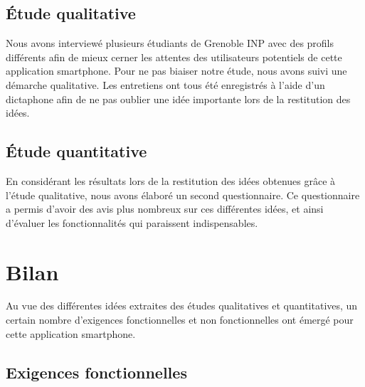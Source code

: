\documentclass[a4paper, 11px]{article}
\begin{document}
\subsection{Étude qualitative}
Nous avons interviewé plusieurs étudiants de Grenoble INP avec des profils différents afin de mieux cerner les attentes des utilisateurs potentiels de cette application smartphone. Pour ne pas biaiser notre étude, nous avons suivi une démarche qualitative.
Les entretiens ont tous été enregistrés à l'aide d'un dictaphone afin de ne pas oublier une idée importante lors de la restitution des idées. 

\subsection{Étude quantitative}
En considérant les résultats lors de la restitution des idées obtenues grâce à l'étude qualitative, nous avons élaboré un second questionnaire. Ce questionnaire a permis d'avoir des avis plus nombreux sur ces différentes idées, et ainsi d'évaluer les fonctionnalités qui paraissent indispensables.

\newpage

\section{Bilan}
Au vue des différentes idées extraites des études qualitatives et quantitatives, un certain nombre d'exigences fonctionnelles et non fonctionnelles ont émergé pour cette application smartphone.

\subsection{Exigences fonctionnelles}
\end{document}
